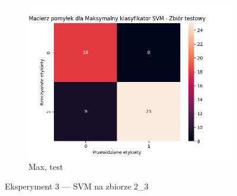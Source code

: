 \documentclass[12pt]{article}
\newcommand*{\subfigwidth}{0.24\textwidth}
\begin{document}
\begin{figure}[H]
\begin{subfigure}[t]{\subfigwidth}
        \includegraphics[width=\linewidth]{img/exp_3/svm/2_3/max/test_matrix.png}
        \caption{Max, test}
    \end{subfigure}

    \caption{Eksperyment 3 --- SVM na zbiorze 2\_3}\label{fig:figure7}
\end{figure}
\clearpage
\end{document}
